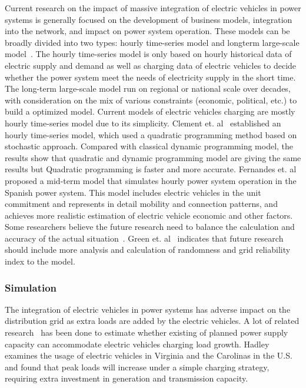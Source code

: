 Current research on the impact of massive integration of electric vehicles in power systems is generally focused on the development of business models, integration into the network, and impact on power system operation.
These models can be broadly divided into two types: hourly time-series model and longterm large-scale model~\cite{YC_David}. 
The hourly time-series model is only based on hourly historical data of electric supply and demand as well as charging data of electric vehicles to decide whether the power system meet the needs of electricity supply in the short time. 
The long-term large-scale model run on regional or national scale over decades, with consideration on the mix of various constraints (economic, political, etc.) to build a optimized model.
Current models of electric vehicles charging are mostly hourly time-series model due to its simplicity.     
Clement et. al~\cite{YC_Stochastic} established an hourly time-series model, which used a quadratic programming method based on stochastic approach. Compared with classical dynamic programming model, the results show that quadratic and dynamic programming model are giving the same results but Quadratic programming is faster and more accurate.
Fernandes et. al~\cite{YC_Fernandes} proposed a mid-term model that simulates hourly power system operation in the Spanish power system. This model includes electric vehicles in the unit commitment and represents in detail mobility and connection patterns, and achieves more realistic estimation of electric vehicle economic and other factors.
Some researchers believe the future research need to balance the calculation and accuracy of the actual situation~\cite{YC_David}. Green et. al~\cite{YC_Green} indicates that future research should include more analysis and calculation of randomness and grid reliability index to the model.

\subsubsection{Simulation}
 
The integration of electric vehicles in power systems has adverse impact on the distribution grid as extra loads are added by the electric vehicles.   
A lot of related research~\cite{YC_Hadley,YC_Hadley18,YC_Letendre19,YC_Kintner20,YC_Denholm21, YC_Hajimiragha23,YC_Hajimiragha24,YC_Hartmann25} has been done to estimate whether existing of planned power supply capacity can accommodate electric vehicles charging load growth.
Hadley~\cite{YC_Hadley18} examines the usage of electric vehicles in Virginia and the Carolinas in the U.S. and found that peak loads will increase under a simple charging strategy, requiring extra investment in generation and transmission capacity.

